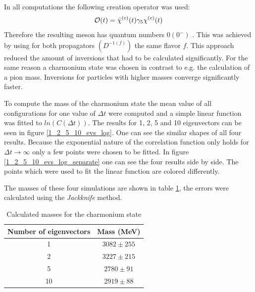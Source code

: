     \noindent
    In all computations the following creation operator was used:
    \begin{equation}
        \mathcal{O}(t) = \bar{\chi}^{(c)}(t)\gamma_5\chi^{(c)}(t)
    \end{equation}
    Therefore the resulting meson has quantum numbers $0(0^-)$ \cite{masses_of_D_mesons}. This was achieved by using for both propagators $(D^{-1(f)})$ the same flavor $f$. This approach reduced the amount of inversions that had to be calculated significantly. For the same reason a charmonium state was chosen in contrast to e.g. the calculation of a pion mass. Inversions for particles with higher masses converge significantly faster.
    
    To compute the mass of the charmonium state the mean value of all configurations for one value of $\Delta t$ were computed and a simple linear function was fitted to $ln(C(\Delta t))$. The results for 1, 2, 5 and 10 eigenvectors can be seen in figure \ref{1_2_5_10_evs_log}. One can see the similar shapes of all four results. Because the exponential nature of the correlation function only holds for $\Delta t \rightarrow \infty$ only a few points were chosen to be fitted. In figure \ref{1_2_5_10_evs_log_separate} one can see the four results side by side. The points which were used to fit the linear function are colored differently.
    
    The masses of these four simulations are shown in table \ref{meson_masses}, the errors were calculated using the \textit{Jackknife} \cite{jackknife} method.
    \begin{table}[h]
            \centering
            \begin{tabular}{|c|c|}
            \hline
            \multicolumn{1}{|c|}{Number of eigenvectors} & \multicolumn{1}{c|}{Mass (MeV)} \\ \hline
             1 & $3082 \pm 255$\\
             2 & $3227 \pm 215$\\
             5 & $2780 \pm 91$\\
             10& $2919 \pm 88$\\
              \hline
            \end{tabular}
            \caption{Calculated masses for the charmonium state}
            \label{meson_masses}
        \end{table}
    
    
    
